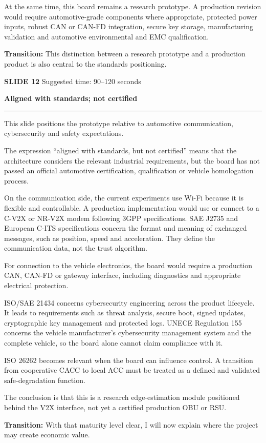\documentclass[11pt,a4paper]{article}
\newcommand{\slidetitle}[3]{%
  \clearpage
  {\color{Accent}\large\bfseries SLIDE #1}\hfill
  {\color{Muted}\small Suggested time: #3}\par
  \vspace{0.18cm}
  {\LARGE\bfseries #2}\par
  \vspace{0.20cm}
  {\color{Muted}\rule{\textwidth}{0.5pt}}\par
  \vspace{0.12cm}
}
\newcommand{\transition}[1]{%
  \vfill
  \colorbox{Panel}{%
    \parbox{\dimexpr\textwidth-2\fboxsep\relax}{%
      \raggedright\textbf{Transition:} #1}}
}
\begin{document}
At the same time, this board remains a research prototype. A production revision would require automotive-grade components where appropriate, protected power inputs, robust CAN or CAN-FD integration, secure key storage, manufacturing validation and automotive environmental and EMC qualification.

\transition{This distinction between a research prototype and a production product is also central to the standards positioning.}

\slidetitle{12}{Aligned with standards; not certified}{90--120 seconds}

This slide positions the prototype relative to automotive communication, cybersecurity and safety expectations.

The expression ``aligned with standards, but not certified'' means that the architecture considers the relevant industrial requirements, but the board has not passed an official automotive certification, qualification or vehicle homologation process.

On the communication side, the current experiments use Wi-Fi because it is flexible and controllable. A production implementation would use or connect to a C-V2X or NR-V2X modem following 3GPP specifications. SAE J2735 and European C-ITS specifications concern the format and meaning of exchanged messages, such as position, speed and acceleration. They define the communication data, not the trust algorithm.

For connection to the vehicle electronics, the board would require a production CAN, CAN-FD or gateway interface, including diagnostics and appropriate electrical protection.

ISO/SAE 21434 concerns cybersecurity engineering across the product lifecycle. It leads to requirements such as threat analysis, secure boot, signed updates, cryptographic key management and protected logs. UNECE Regulation 155 concerns the vehicle manufacturer's cybersecurity management system and the complete vehicle, so the board alone cannot claim compliance with it.

ISO 26262 becomes relevant when the board can influence control. A transition from cooperative CACC to local ACC must be treated as a defined and validated safe-degradation function.

The conclusion is that this is a research edge-estimation module positioned behind the V2X interface, not yet a certified production OBU or RSU.

\transition{With that maturity level clear, I will now explain where the project may create economic value.}
\end{document}
